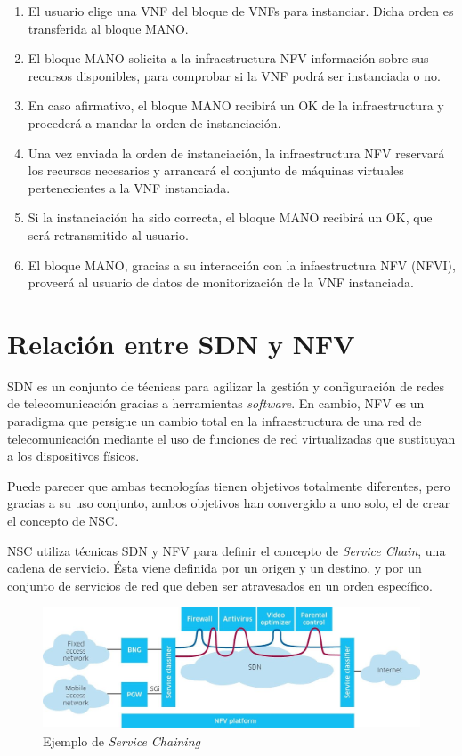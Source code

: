 \begin{enumerate}
	\item El usuario elige una \ac{VNF} del bloque de \acp{VNF} para instanciar. Dicha orden es transferida al bloque \ac{MANO}.
	\item El bloque \ac{MANO} solicita a la infraestructura \ac{NFV} información sobre sus recursos disponibles, para comprobar si la \ac{VNF} podrá ser instanciada o no.
	\item En caso afirmativo, el bloque MANO recibirá un OK de la infraestructura y procederá a mandar la orden de instanciación.
	\item Una vez enviada la orden de instanciación, la infraestructura \ac{NFV} reservará los recursos necesarios y arrancará el conjunto de máquinas virtuales pertenecientes a la \ac{VNF} instanciada.
	\item Si la instanciación ha sido correcta, el bloque MANO recibirá un OK, que será retransmitido al usuario.
	\item El bloque \ac{MANO}, gracias a su interacción con la infaestructura \ac{NFV} (\ac{NFVI}), proveerá al usuario de datos de monitorización de la \ac{VNF} instanciada.
\end{enumerate}

\section{Relación entre SDN y NFV}
\label{sec:sdnnfv}

\ac{SDN} es un conjunto de técnicas para agilizar la gestión y configuración de redes de telecomunicación gracias a herramientas \textit{software}. En cambio, \ac{NFV} es un paradigma que persigue un cambio total en la infraestructura de una red de telecomunicación mediante el uso de funciones de red virtualizadas que sustituyan a los dispositivos físicos.

Puede parecer que ambas tecnologías tienen objetivos totalmente diferentes, pero gracias a su uso conjunto, ambos objetivos han convergido a uno solo, el de crear el concepto de \ac{NSC}.

\ac{NSC} utiliza técnicas \ac{SDN} y \ac{NFV} para definir el concepto de \textit{Service Chain}, una cadena de servicio. Ésta viene definida por un origen y un destino, y por un conjunto de servicios de red que deben ser atravesados en un orden específico.\cite{servicechainingbib}

\begin{figure}[!ht]
	\centering
	\includegraphics[width=0.8\linewidth]{imagenes/servicechaining}
	\caption{Ejemplo de \textit{Service Chaining}}
	\label{fig:servicechaining}
\end{figure}

